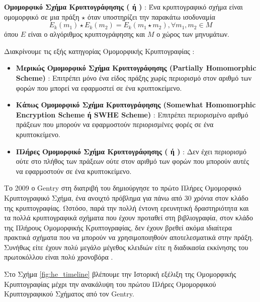 \begin{definition}
\textbf{Ομομορφικό Σχήμα Κρυπτογράφησης ( ή )} : Ένα κρυπτογραφικό σχήμα είναι ομομορφικό σε μια πράξη $\star$ όταν υποστηρίζει την παρακάτω ισοδυναμία
\begin{equation}
E_k(m_1) \star E_k(m_2) = E_k(m_1 \star m_2), \forall m_1, m_2 \in M
\end{equation}
όπου $E$ είναι ο αλγόριθμος κρυπτογράφησης και $M$ ο χώρος των μηνυμάτων.
\end{definition}
%
Διακρίνουμε τις εξής κατηγορίας Ομομορφικής Κρυπτογραφίας :
%
\begin{definition}
\begin{itemize}[leftmargin=*]
\textbf{Κύριες Κατηγορίες Ομομορφικής Κρυπτογράφησης} :
\item \textbf{Μερικώς Ομομορφικό Σχήμα Κρυπτογράφησης (Partially Homomorphic Scheme)} : Επιτρέπει μόνο ένα είδος πράξης χωρίς περιορισμό στον αριθμό των φορών που μπορεί να εφαρμοστεί σε ένα κρυπτοκείμενο.
\item \textbf{Κάπως Ομομορφικό Σχήμα Κρυπτογράφησης (Somewhat Homomorphic Encryption Scheme ή SWHE Scheme)} : Επιτρέπει περιορισμένο αριθμό πράξεων που μπορούν να εφαρμοστούν περιορισμένες φορές σε ένα κρυπτοκείμενο.
\item \textbf{Πλήρες Ομομορφικό Σχήμα Κρυπτογράφησης ( ή )} : Δεν έχει περιορισμό ούτε στο πλήθος των πράξεων ούτε στον αριθμό των φορών που μπορούν αυτές να εφαρμοστούν σε ένα κρυπτοκείμενο.
\end{itemize}
\end{definition}

Το 2009 ο Gentry στη διατριβή του \cite{10.1145/1536414.1536440} δημιούργησε το πρώτο Πλήρες Ομομορφικό Κρυπτογραφικό Σχήμα, ένα ανοιχτό πρόβλημα για πάνω από 30 χρόνια στον κλάδο της κρυπτογραφίας. Ωστόσο, παρά την πολλή έντονη ερευνητική δραστηριότητα και τα πολλά κρυπτογραφικά σχήματα που έχουν προταθεί στη βιβλιογραφία, στον κλάδο της Πλήρους Ομομορφικής Κρυπτογραφίας, δεν έχουν βρεθεί ακόμα ιδιαίτερα πρακτικά σχήματα που να μπορούν να χρησιμοποιηθούν αποτελεσματικά στην πράξη. Συνήθως είτε έχουν πολύ μεγάλο μέγεθος κλειδιών είτε η διαδικασία εκκίνησης του πρωτοκόλλου είναι πολύ χρονοβόρα \cite{10.1007/978-3-642-20465-4_9}.

Στο Σχήμα \ref{fig:he_timeline} βλέπουμε την Ιστορική εξέλιξη της Ομομορφικής Κρυπτογραφίας μέχρι την ανακάλυψη του πρώτου Πλήρες Ομομορφικού Κρυπτογραφικού Σχήματος από τον Gentry.

